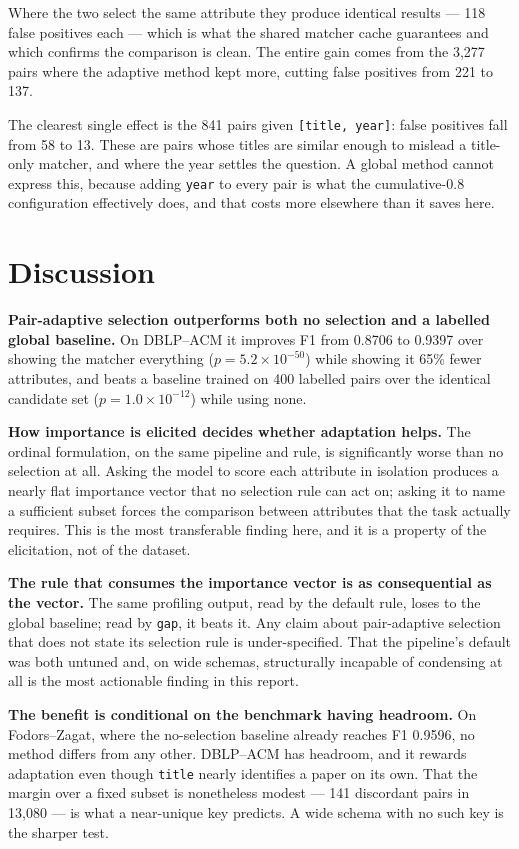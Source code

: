 \documentclass[11pt]{article}
\begin{document}
Where the two select the same attribute they produce identical results --- 118 false
positives each --- which is what the shared matcher cache guarantees and which confirms the
comparison is clean. The entire gain comes from the 3{,}277 pairs where the adaptive method
kept more, cutting false positives from 221 to 137.

The clearest single effect is the 841 pairs given \texttt{[title, year]}: false positives
fall from 58 to 13. These are pairs whose titles are similar enough to mislead a
title-only matcher, and where the year settles the question. A global method cannot express
this, because adding \texttt{year} to every pair is what the cumulative-0.8 configuration
effectively does, and that costs more elsewhere than it saves here.

\section{Discussion}
\label{sec:discussion}

\textbf{Pair-adaptive selection outperforms both no selection and a labelled global
baseline.} On DBLP--ACM it improves F1 from 0.8706 to 0.9397 over showing the matcher
everything ($p = 5.2\times10^{-50}$) while showing it 65\% fewer attributes, and beats a
baseline trained on 400 labelled pairs over the identical candidate set
($p = 1.0\times10^{-12}$) while using none.

\textbf{How importance is elicited decides whether adaptation helps.} The ordinal
formulation, on the same pipeline and rule, is significantly worse than no selection at all.
Asking the model to score each attribute in isolation produces a nearly flat importance
vector that no selection rule can act on; asking it to name a sufficient subset forces the
comparison between attributes that the task actually requires. This is the most transferable
finding here, and it is a property of the elicitation, not of the dataset.

\textbf{The rule that consumes the importance vector is as consequential as the vector.} The
same profiling output, read by the default rule, loses to the global baseline; read by
\texttt{gap}, it beats it. Any claim about pair-adaptive selection that does not state its
selection rule is under-specified. That the pipeline's default was both untuned and, on wide
schemas, structurally incapable of condensing at all is the most actionable finding in this
report.

\textbf{The benefit is conditional on the benchmark having headroom.} On Fodors--Zagat, where
the no-selection baseline already reaches F1 0.9596, no method differs from any other.
DBLP--ACM has headroom, and it rewards adaptation even though \texttt{title} nearly
identifies a paper on its own. That the margin over a fixed subset is nonetheless modest ---
141 discordant pairs in 13{,}080 --- is what a near-unique key predicts. A wide schema with
no such key is the sharper test.
\end{document}
